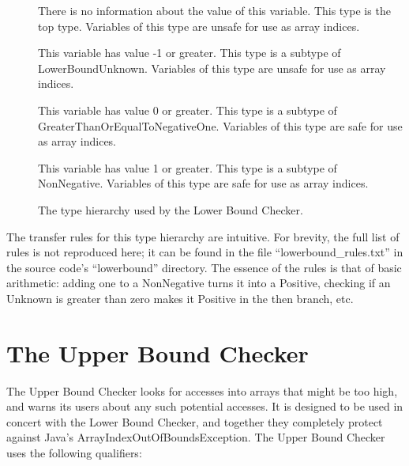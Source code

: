 \begin{description}
\item[]
  There is no information about the value of this variable.
  This type is the top type. Variables of this type are
  unsafe for use as array indices.
\item[]
  This variable has value -1 or greater. This type is a subtype of LowerBoundUnknown.
  Variables of this type are unsafe for use as array indices.
\item[]
  This variable has value 0 or greater. This type is a subtype of GreaterThanOrEqualToNegativeOne.
  Variables of this type are safe for use as array indices.
\item[]
  This variable has value 1 or greater. This type is a subtype of NonNegative.
  Variables of this type are safe for use as array indices.
\end{description}

\begin{figure}
\caption{The type hierarchy used by the Lower Bound Checker.}
\label{fig-lowerbound-types}
\end{figure}

The transfer rules for this type hierarchy are intuitive. For brevity,
the full list of rules is not reproduced here; it can be found in the file
``lowerbound\_rules.txt'' in the source code's ``lowerbound'' directory.
The essence of the rules is that of basic arithmetic: adding one to a
NonNegative turns it into a Positive, checking if an Unknown is greater
than zero makes it Positive in the then branch, etc.

\section{The Upper Bound Checker\label{index-upperbound}}

The Upper Bound Checker looks for accesses into arrays that might be
too high, and warns its users about any such potential accesses. It is
designed to be used in concert with the Lower Bound Checker, and
together they completely protect against Java's
ArrayIndexOutOfBoundsException. The Upper Bound Checker uses the following
qualifiers:

